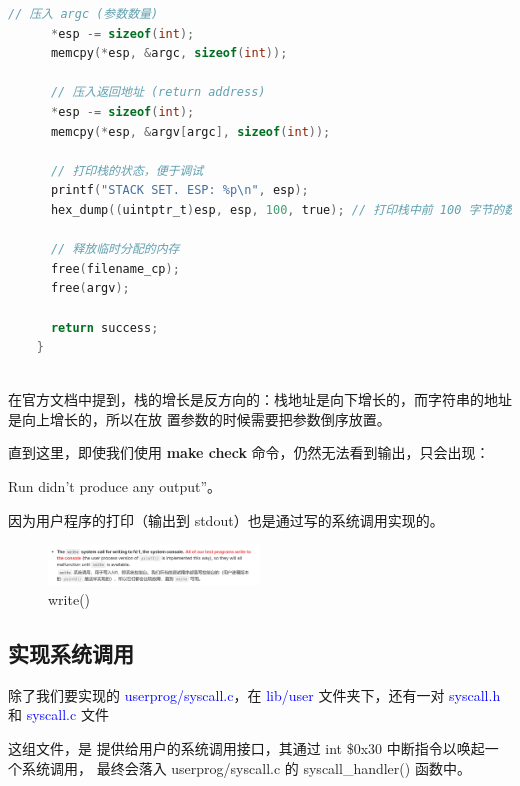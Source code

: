 \documentclass[14pt,a4paper,UTF8,twoside]{article}
\renewcommand{\texttt}[1]{\textcolor{blue}{\ttfamily #1}}
\begin{document}
\begin{lstlisting}[language=C, title= setup\_stack]
      // 压入 argc (参数数量)
      *esp -= sizeof(int);
      memcpy(*esp, &argc, sizeof(int));
    
      // 压入返回地址 (return address)
      *esp -= sizeof(int);
      memcpy(*esp, &argv[argc], sizeof(int));
    
      // 打印栈的状态，便于调试
      printf("STACK SET. ESP: %p\n", esp);
      hex_dump((uintptr_t)esp, esp, 100, true); // 打印栈中前 100 字节的数据，便于调试
    
      // 释放临时分配的内存
      free(filename_cp);
      free(argv);
    
      return success;
    }
    
\end{lstlisting}

\begin{ctt}
    在官方文档中提到，栈的增长是反方向的：栈地址是向下增长的，而字符串的地址是向上增长的，所以在放
    置参数的时候需要把参数倒序放置。
\end{ctt}

直到这里，即使我们使用 \textbf{make check} 命令，仍然无法看到输出，只会出现：

\begin{mdframed}
    Run didn’t produce any output”。
\end{mdframed}

因为用户程序的打印（输出到 stdout）也是通过写的系统调用实现的。

\begin{figure}[H]
    \centering
    \includegraphics[width=0.5\textwidth]{img5/write.png}
    \caption{write()}
    \label{fig:fail}
\end{figure}

\subsection{实现系统调用}

除了我们要实现的 \texttt{userprog/syscall.c}，在 \texttt{lib/user} 文件夹下，还有一对 \texttt{syscall.h} 和 \texttt{syscall.c} 文件

\begin{ctt}
这组文件，是 提供给用户的系统调用接口，其通过 int \$0x30 
中断指令以唤起一个系统调用，
最终会落入 userprog/syscall.c 的 syscall\_handler() 函数中。
\end{ctt}
\end{document}
